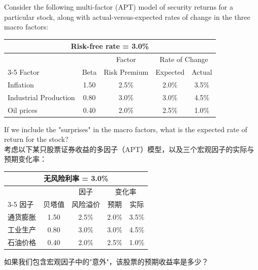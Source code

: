 \documentclass{article}
\newcounter{question} %
\begin{document}
\begin{question}
    Consider the following multi-factor (APT) model of security returns for a particular stock, along with actual-versus-expected rates of change in the three macro factors:

    \begin{table}[H]
        \centering
        \begin{tabular}{|l|c|c|c|c|}
            \hline
            \multicolumn{5}{|c|}{Risk-free rate = 3.0\%} \\
            \hline
            & & Factor & \multicolumn{2}{c|}{Rate of Change} \\
            \cline{3-5}
            Factor & Beta & Risk Premium & Expected & Actual \\
            \hline
            Inflation & 1.50 & 2.5\% & 2.0\% & 3.5\% \\
            Industrial Production & 0.80 & 3.0\% & 3.0\% & 4.5\% \\
            Oil prices & 0.40 & 2.0\% & 2.5\% & 1.0\% \\
            \hline
        \end{tabular}
    \end{table}

    If we include the "surprises" in the macro factors, what is the expected rate of return for the stock?
    \\考虑以下某只股票证券收益的多因子（APT）模型，以及三个宏观因子的实际与预期变化率：

    \begin{table}[H]
        \centering
        \begin{tabular}{|l|c|c|c|c|}
            \hline
            \multicolumn{5}{|c|}{无风险利率 = 3.0\%} \\
            \hline
            & & 因子 & \multicolumn{2}{c|}{变化率} \\
            \cline{3-5}
            因子 & 贝塔值 & 风险溢价 & 预期 & 实际 \\
            \hline
            通货膨胀 & 1.50 & 2.5\% & 2.0\% & 3.5\% \\
            工业生产 & 0.80 & 3.0\% & 3.0\% & 4.5\% \\
            石油价格 & 0.40 & 2.0\% & 2.5\% & 1.0\% \\
            \hline
        \end{tabular}
    \end{table}

    如果我们包含宏观因子中的"意外"，该股票的预期收益率是多少？
\end{question}
\end{document}
